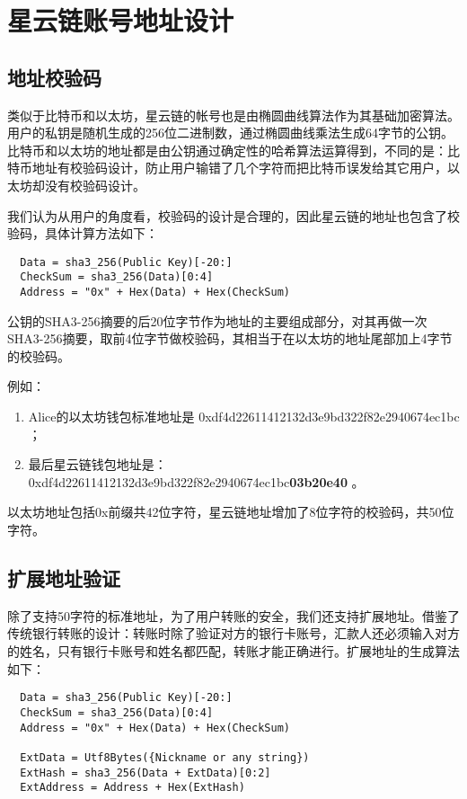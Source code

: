\section{星云链账号地址设计}

\subsection{地址校验码}
类似于比特币和以太坊，星云链的帐号也是由椭圆曲线算法作为其基础加密算法。
用户的私钥是随机生成的256位二进制数，通过椭圆曲线乘法生成64字节的公钥。
比特币和以太坊的地址都是由公钥通过确定性的哈希算法运算得到，不同的是：比特币地址有校验码设计，防止用户输错了几个字符而把比特币误发给其它用户，以太坊却没有校验码设计。

我们认为从用户的角度看，校验码的设计是合理的，因此星云链的地址也包含了校验码，具体计算方法如下：

\begin{verbatim}
  Data = sha3_256(Public Key)[-20:]
  CheckSum = sha3_256(Data)[0:4]
  Address = "0x" + Hex(Data) + Hex(CheckSum)
\end{verbatim}

公钥的SHA3-256摘要的后20位字节作为地址的主要组成部分，对其再做一次SHA3-256摘要，取前4位字节做校验码，其相当于在以太坊的地址尾部加上4字节的校验码。

例如：
\begin{enumerate}
  \item Alice的以太坊钱包标准地址是 0xdf4d22611412132d3e9bd322f82e2940674ec1bc ；
  \item 最后星云链钱包地址是： 0xdf4d22611412132d3e9bd322f82e2940674ec1bc\textbf{03b20e40} 。
\end{enumerate}

以太坊地址包括0x前缀共42位字符，星云链地址增加了8位字符的校验码，共50位字符。

\subsection{扩展地址验证}
除了支持50字符的标准地址，为了用户转账的安全，我们还支持扩展地址。借鉴了传统银行转账的设计：转账时除了验证对方的银行卡账号，汇款人还必须输入对方的姓名，只有银行卡账号和姓名都匹配，转账才能正确进行。扩展地址的生成算法如下：

\begin{verbatim}
  Data = sha3_256(Public Key)[-20:]
  CheckSum = sha3_256(Data)[0:4]
  Address = "0x" + Hex(Data) + Hex(CheckSum)

  ExtData = Utf8Bytes({Nickname or any string})
  ExtHash = sha3_256(Data + ExtData)[0:2]
  ExtAddress = Address + Hex(ExtHash)
\end{verbatim}

